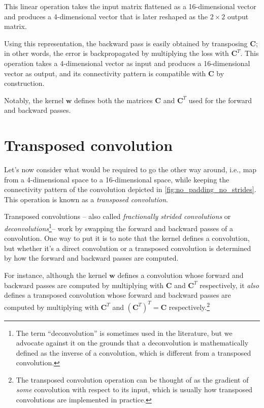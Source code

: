 \documentclass[notitlepage]{report}
\begin{document}
This linear operation takes the input matrix flattened as a 16-dimensional
vector and produces a 4-dimensional vector that is later reshaped as the $2
\times 2$ output matrix.

Using this representation, the backward pass is easily obtained by transposing
$\mathbf{C}$; in other words, the error is backpropagated by multiplying the
loss with $\mathbf{C}^T$. This operation takes a 4-dimensional vector as input
and produces a 16-dimensional vector as output, and its connectivity pattern is
compatible with $\mathbf{C}$ by construction.

Notably, the kernel $\mathbf{w}$ defines both the matrices $\mathbf{C}$ and
$\mathbf{C}^T$ used for the forward and backward passes.

\section{Transposed convolution}

Let's now consider what would be required to go the other way around, i.e., map
from a 4-dimensional space to a 16-dimensional space, while keeping the
connectivity pattern of the convolution depicted in
\autoref{fig:no_padding_no_strides}. This operation is known as a {\em
transposed convolution}.

Transposed convolutions -- also called {\em fractionally strided convolutions\/}
or {\em deconvolutions\/}\footnote{The term ``deconvolution'' is sometimes used
in the literature, but we advocate against it on the grounds that a
deconvolution is mathematically defined as the inverse of a convolution, which
is different from a transposed convolution.}-- work by swapping the forward and
backward passes of a convolution. One way to put it is to note that the kernel
defines a convolution, but whether it's a direct convolution or a transposed
convolution is determined by how the forward and backward passes are computed.

For instance, although the kernel $\mathbf{w}$ defines a convolution whose
forward and backward passes are computed by multiplying with $\mathbf{C}$ and
$\mathbf{C}^T$ respectively, it {\em also\/} defines a transposed convolution
whose forward and backward passes are computed by multiplying with
$\mathbf{C}^T$ and $(\mathbf{C}^T)^T = \mathbf{C}$ respectively.\footnote{The
    transposed convolution operation can be thought of as the gradient of {\em
    some\/} convolution with respect to its input, which is usually how
    transposed convolutions are implemented in practice.}
\end{document}

